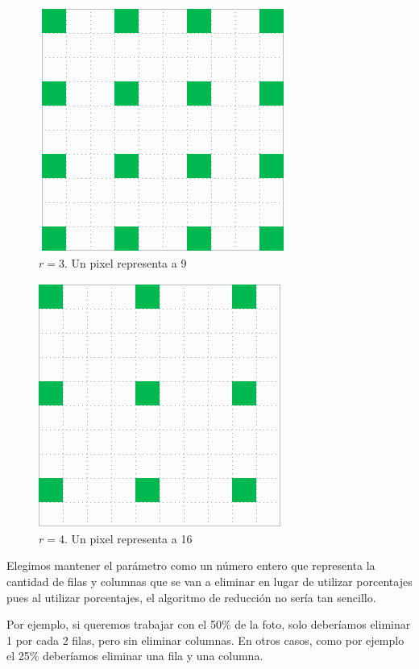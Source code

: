\documentclass[a4paper]{article}
\begin{document}
\begin{figure}[H]
  \centering
  \includegraphics[scale=0.65]{graficos/Submuestreo-3.png}
  \caption{ $r=3$. Un pixel representa a 9}
\end{figure}

\begin{figure}[H]
  \centering
  \includegraphics[scale=0.65]{graficos/Submuestreo-4.png}
  \caption{ $r=4$. Un pixel representa a 16}
\end{figure}

Elegimos mantener el parámetro como un número entero que representa la cantidad de filas y columnas que se van a eliminar en lugar de utilizar porcentajes pues al utilizar porcentajes, el algoritmo de reducción no sería tan sencillo.

Por ejemplo, si queremos trabajar con el 50\% de la foto, solo deberíamos eliminar 1 por cada 2 filas, pero sin eliminar columnas. En otros casos, como por ejemplo el 25\% deberíamos eliminar una fila y una columna.
\end{document}
